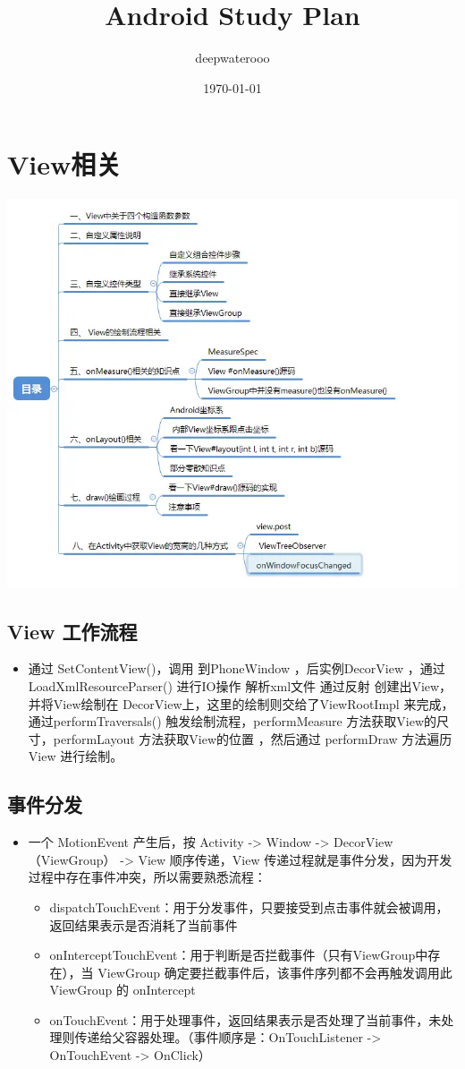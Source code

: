 \documentclass[9pt, b5paper]{article}
\author{deepwaterooo}
\date{\today}
\title{Android Study Plan}
\begin{document}
\maketitle
\tableofcontents


\section{View相关}
\label{sec-1}

\includegraphics[width=.9\linewidth]{./pic/viewas.png}

\subsection{View 工作流程}
\label{sec-1-1}
\begin{itemize}
\item 通过 SetContentView()，调用 到PhoneWindow ，后实例DecorView ，通过 LoadXmlResourceParser() 进行IO操作 解析xml文件 通过反射 创建出View，并将View绘制在 DecorView上，这里的绘制则交给了ViewRootImpl 来完成，通过performTraversals() 触发绘制流程，performMeasure 方法获取View的尺寸，performLayout 方法获取View的位置 ，然后通过 performDraw 方法遍历View 进行绘制。
\end{itemize}
\subsection{事件分发}
\label{sec-1-2}
\begin{itemize}
\item 一个 MotionEvent 产生后，按 Activity -> Window -> DecorView（ViewGroup） -> View 顺序传递，View 传递过程就是事件分发，因为开发过程中存在事件冲突，所以需要熟悉流程：
\begin{itemize}
\item dispatchTouchEvent：用于分发事件，只要接受到点击事件就会被调用，返回结果表示是否消耗了当前事件
\item onInterceptTouchEvent：用于判断是否拦截事件（只有ViewGroup中存在），当 ViewGroup 确定要拦截事件后，该事件序列都不会再触发调用此 ViewGroup 的 onIntercept
\item onTouchEvent：用于处理事件，返回结果表示是否处理了当前事件，未处理则传递给父容器处理。（事件顺序是：OnTouchListener -> OnTouchEvent -> OnClick）
\end{itemize}
\end{itemize}
\end{document}
